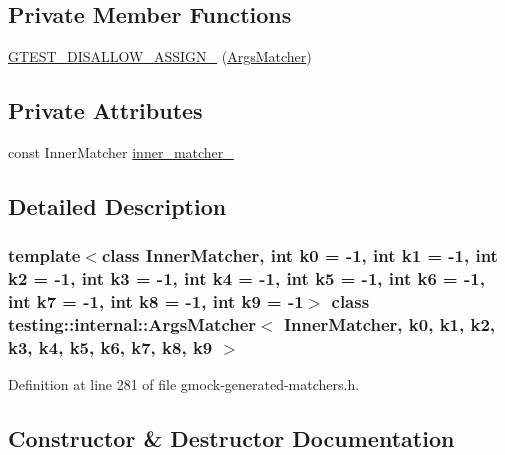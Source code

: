 \subsection*{Private Member Functions}
\begin{DoxyCompactItemize}
\item 
\hyperlink{classtesting_1_1internal_1_1ArgsMatcher_aa928e2846eafb7ddcda795d7c3dd526c}{G\+T\+E\+S\+T\+\_\+\+D\+I\+S\+A\+L\+L\+O\+W\+\_\+\+A\+S\+S\+I\+G\+N\+\_\+} (\hyperlink{classtesting_1_1internal_1_1ArgsMatcher}{Args\+Matcher})
\end{DoxyCompactItemize}
\subsection*{Private Attributes}
\begin{DoxyCompactItemize}
\item 
const Inner\+Matcher \hyperlink{classtesting_1_1internal_1_1ArgsMatcher_ac76e55e4b52e18fa0c57aad4814a8a70}{inner\+\_\+matcher\+\_\+}
\end{DoxyCompactItemize}


\subsection{Detailed Description}
\subsubsection*{template$<$class Inner\+Matcher, int k0 = -\/1, int k1 = -\/1, int k2 = -\/1, int k3 = -\/1, int k4 = -\/1, int k5 = -\/1, int k6 = -\/1, int k7 = -\/1, int k8 = -\/1, int k9 = -\/1$>$\newline
class testing\+::internal\+::\+Args\+Matcher$<$ Inner\+Matcher, k0, k1, k2, k3, k4, k5, k6, k7, k8, k9 $>$}



Definition at line 281 of file gmock-\/generated-\/matchers.\+h.



\subsection{Constructor \& Destructor Documentation}
\mbox{\label{classtesting_1_1internal_1_1ArgsMatcher_a2879d7455f2da2a5a2f2b6759dbc0561}} 
